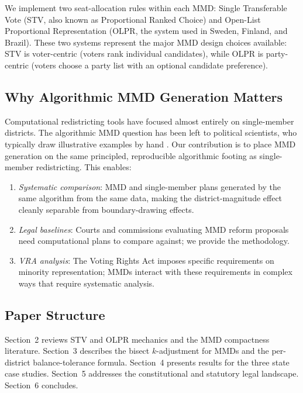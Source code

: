 We implement two seat-allocation rules within each MMD: Single Transferable
Vote (STV, also known as Proportional Ranked Choice) and Open-List
Proportional Representation (OLPR, the system used in Sweden, Finland, and
Brazil).  These two systems represent the major MMD design choices available:
STV is voter-centric (voters rank individual candidates), while OLPR is
party-centric (voters choose a party list with an optional candidate preference).

\subsection{Why Algorithmic MMD Generation Matters}

Computational redistricting tools have focused almost entirely on
single-member districts.  The algorithmic MMD question has been left to
political scientists, who typically draw illustrative examples by hand
\citep{rush2000redistricting}.  Our contribution is to place MMD generation
on the same principled, reproducible algorithmic footing as single-member
redistricting.  This enables:

\begin{enumerate}
  \item \emph{Systematic comparison}: MMD and single-member plans generated by
    the same algorithm from the same data, making the district-magnitude
    effect cleanly separable from boundary-drawing effects.
  \item \emph{Legal baselines}: Courts and commissions evaluating MMD reform
    proposals need computational plans to compare against; we provide the
    methodology.
  \item \emph{VRA analysis}: The Voting Rights Act imposes specific
    requirements on minority representation; MMDs interact with these
    requirements in complex ways that require systematic analysis.
\end{enumerate}

\subsection{Paper Structure}

Section~2 reviews STV and OLPR mechanics and the MMD compactness literature.
Section~3 describes the bisect $k$-adjustment for MMDs and the per-district
balance-tolerance formula.  Section~4 presents results for the three state
case studies.  Section~5 addresses the constitutional and statutory legal
landscape.  Section~6 concludes.
